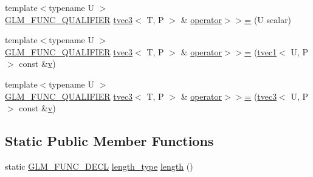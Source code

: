 \begin{DoxyCompactItemize}
\item 
{\footnotesize template$<$typename U $>$ }\\\mbox{\hyperlink{setup_8hpp_a33fdea6f91c5f834105f7415e2a64407}{G\+L\+M\+\_\+\+F\+U\+N\+C\+\_\+\+Q\+U\+A\+L\+I\+F\+I\+ER}} \mbox{\hyperlink{structglm_1_1tvec3}{tvec3}}$<$ T, P $>$ \& \mbox{\hyperlink{structglm_1_1tvec3_a2a74bf77a4e9edbe14166fdfedb7f3f9}{operator$>$$>$=}} (U scalar)
\item 
{\footnotesize template$<$typename U $>$ }\\\mbox{\hyperlink{setup_8hpp_a33fdea6f91c5f834105f7415e2a64407}{G\+L\+M\+\_\+\+F\+U\+N\+C\+\_\+\+Q\+U\+A\+L\+I\+F\+I\+ER}} \mbox{\hyperlink{structglm_1_1tvec3}{tvec3}}$<$ T, P $>$ \& \mbox{\hyperlink{structglm_1_1tvec3_a2f08b19372b6573b24cb81ed5657f8a3}{operator$>$$>$=}} (\mbox{\hyperlink{structglm_1_1tvec1}{tvec1}}$<$ U, P $>$ const \&\mbox{\hyperlink{glad_8h_a14cfbe2fc2234f5504618905b69d1e06}{v}})
\item 
{\footnotesize template$<$typename U $>$ }\\\mbox{\hyperlink{setup_8hpp_a33fdea6f91c5f834105f7415e2a64407}{G\+L\+M\+\_\+\+F\+U\+N\+C\+\_\+\+Q\+U\+A\+L\+I\+F\+I\+ER}} \mbox{\hyperlink{structglm_1_1tvec3}{tvec3}}$<$ T, P $>$ \& \mbox{\hyperlink{structglm_1_1tvec3_adfdb21940170dce288bebfff52613ebc}{operator$>$$>$=}} (\mbox{\hyperlink{structglm_1_1tvec3}{tvec3}}$<$ U, P $>$ const \&\mbox{\hyperlink{glad_8h_a14cfbe2fc2234f5504618905b69d1e06}{v}})
\end{DoxyCompactItemize}
\subsection*{Static Public Member Functions}
\begin{DoxyCompactItemize}
\item 
static \mbox{\hyperlink{setup_8hpp_ab2d052de21a70539923e9bcbf6e83a51}{G\+L\+M\+\_\+\+F\+U\+N\+C\+\_\+\+D\+E\+CL}} \mbox{\hyperlink{structglm_1_1tvec3_a3a79c6a1cfc9fb8821a0a878fa2de91a}{length\+\_\+type}} \mbox{\hyperlink{structglm_1_1tvec3_a484e455bf464a07e7679790637aaf1a7}{length}} ()
\end{DoxyCompactItemize}
